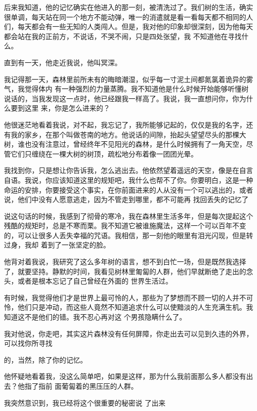 \documentclass{article}
\begin{document}
后来我知道，他的记忆确实在他进入的那一刻，被清洗过了。我们树的生活，确实很单调，每天站在同一个地方不能动弹，唯一的消遣就是看一看每天都不相同的人们，每天都会有一些无知的人类闯人。但是，我对他的印象却很深刻，因为他每天都会站在我的正前方，不说话，不哭不闹，只是四处张望，我
不知道他在寻找什么。 


直到有一天，他走近我说，他叫冥深。 

我记得那一天，森林里前所未有的晦暗潮湿，似乎每一寸泥土间都氮氯着诡异的雾气，我觉得体内
\newpage
有一种强烈的力量蒸腾。我不知道他是什么时候开始能够听懂树说话的，当我发现这一点时，他已经跟我一样高了。我说，我一直想问你，你为什么要到这里
来，你是怎么进来的？ 

他很迷茫地看着我说，对不起，我忘记了，我所能够记起的，仅仅是我的名字，还有我的家乡，在那个叫做苍南的地方。他说话的间隙，抬起头望望尽头的那棵大树，谁也没有注意过，曾经终年不见阳光的森林，是什么时候拥有了一角天空，尽管它们只缠绕在一棵大树的树顶，疏松地分布着像一团团光晕。
 

我找到你，只是想让你告诉我，怎么逃出去。他依然望着遥远的天空，像是在自言自语。我说，你应该知道这里的规矩吧，我什么也帮不了你。你要明白，这是一种命运的安排，你要接受这个事实，在你前面进来的人从没有一个可以逃出的，或者说，他们中没有人愿意逃走，因为不管走到哪里，都不可能再
找回丢失的记忆了 

\newpage

说这句话的时候，我感到了彻骨的寒冷，我在森林里生活多年，但是每次提起这个残酷的规矩时，总是不寒而栗。我不知道它被谁施魔法，这样一个可以百年不变的，可以让很多人丢失幸福的咒语。我相信，那一刻他的眼里有泪光闪现，但是转过身，我却
着到了一张坚定的脸。 

他背对着我说，我研究了这么多年树的语言，想不到白忙一场，但是既然我选择了，就要坚持。静默的时间，我看见树林里匍匐的人群，他们早就断绝了走出的念头，或者是根本忘记了自己曾经在外面的
世界生活过。 

有时候，我觉得他们才是世界上最可怜的人，那些为了梦想而不顾一切的人并不可怜，他们只是冲动，而这些人竟然不知道追求什么可以使黯淡的人生充满生机。我知道这不是他们的错。我不忍心再对这
个男孩隐瞒什么了。 

我对他说，你走吧，其实这片森林没有任何屏障，你走出去可以见到久违的外界，可以找你所寻找
\newpage

的，当然，除了你的记忆。 

他怀疑地看着我，没这么简单吧，如果是这样，那为什么我前面那么多人都没有出去？他指了指前
面葡匐着的黑压压的人群。 

我突然意识到，我已经将这个很重要的秘密说
了出来 
\end{document}
